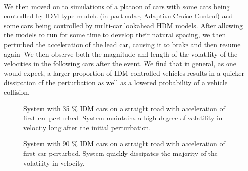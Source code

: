 \documentclass[12pt]{article}
\begin{document}
\paragraph{}We then moved on to simulations of a platoon of cars with some cars being controlled by IDM-type models (in particular, Adaptive Cruise Control) and some cars being controlled by multi-car lookahead HDM models. After allowing the models to run for some time to develop their natural spacing, we then perturbed the acceleration of the lead car, causing it to brake and then resume again. We then observe both the magnitude and length of the volatility of the velocities in the following cars after the event. We find that in general, as one would expect, a larger proportion of IDM-controlled vehicles results in a quicker dissipation of the perturbation as well as a lowered probability of a vehicle collision.\\

\begin{figure}[H]
  \centering
  \caption{System with 35 \% IDM cars on a straight road with acceleration of first car perturbed. System maintains a high degree of volatility in velocity long after the initial perturbation.}
\end{figure}

\begin{figure}[H]
  \centering
  \caption{System with 90 \% IDM cars on a straight road with acceleration of first car perturbed. System quickly dissipates the majority of the volatility in velocity.}
\end{figure}
\end{document}
